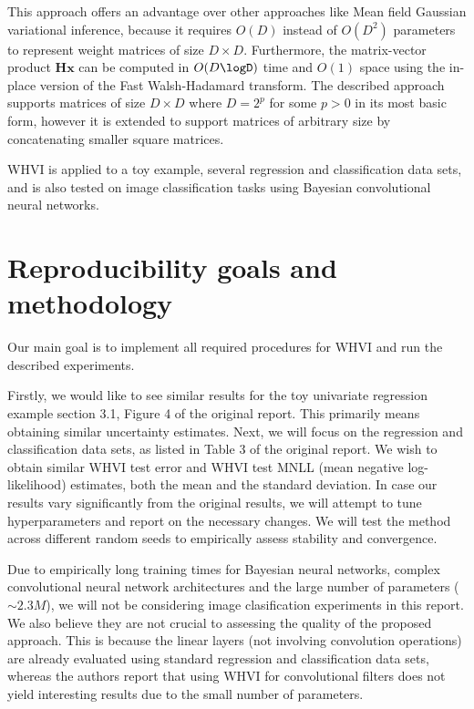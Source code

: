 \documentclass[11pt]{article}
\begin{document}
    This approach offers an advantage over other approaches like Mean field Gaussian variational inference, because it requires $O(D)$ instead of $O(D^2)$ parameters to represent weight matrices of size $D \times D$.
    Furthermore, the matrix-vector product $\mathbf{H}\mathbf{x}$ can be computed in $O(D \logD)$ time and $O(1)$ space using the in-place version of the Fast Walsh-Hadamard transform.
    The described approach supports matrices of size $D \times D$ where $D = 2^p$ for some $p > 0$ in its most basic form, however it is extended to support matrices of arbitrary size by concatenating smaller square matrices.

    WHVI is applied to a toy example, several regression and classification data sets, and is also tested on image classification tasks using Bayesian convolutional neural networks.


    \section{Reproducibility goals and methodology}\label{sec:reproducibility-goals}
    Our main goal is to implement all required procedures for WHVI and run the described experiments.

    Firstly, we would like to see similar results for the toy univariate regression example section 3.1, Figure 4 of the original report.
    This primarily means obtaining similar uncertainty estimates.
    Next, we will focus on the regression and classification data sets, as listed in Table 3 of the original report.
    We wish to obtain similar WHVI test error and WHVI test MNLL (mean negative log-likelihood) estimates, both the mean and the standard deviation.
    In case our results vary significantly from the original results, we will attempt to tune hyperparameters and report on the necessary changes.
    We will test the method across different random seeds to empirically assess stability and convergence.

    Due to empirically long training times for Bayesian neural networks, complex convolutional neural network architectures and the large number of parameters ($\sim 2.3M$), we will not be considering image clasification experiments in this report.
    We also believe they are not crucial to assessing the quality of the proposed approach.
    This is because the linear layers (not involving convolution operations) are already evaluated using standard regression and classification data sets, whereas the authors report that using WHVI for convolutional filters does not yield interesting results due to the small number of parameters.
\end{document}
